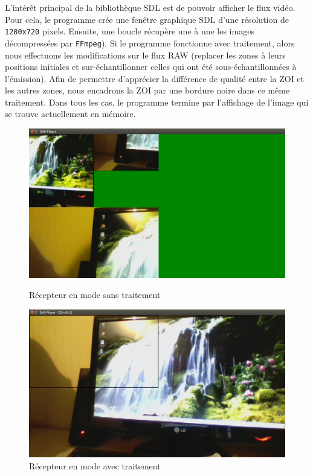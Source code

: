 \documentclass[11pt,a4paper]{article}
\begin{document}
\bigbreak
L'intérêt principal de la bibliothèque SDL est de pouvoir afficher le flux vidéo.
Pour cela, le programme crée une fenêtre graphique SDL d'une résolution de \texttt{1280x720} pixels.
Ensuite, une boucle récupère une à une les images décompressées par \texttt{FFmpeg}).
Si le programme fonctionne avec traitement, alors nous effectuons les modifications sur le flux RAW (replacer les zones à leurs positions initiales et sur-échantillonner celles qui ont été sous-échantillonnées à l'émission). 
Afin de permettre d'apprécier la différence de qualité entre la ZOI et les autres zones, nous encadrons la ZOI par une bordure noire dans ce même traitement.
Dans tous les cas, le programme termine par l'affichage de l'image qui se trouve actuellement en mémoire.

\begin{figure}[H]
  \includegraphics[width=\linewidth]{images/recepteur_sans_traitement.png}
  \caption{Récepteur en mode sans traitement}
\endminipage\hfill
{}
  \includegraphics[width=\linewidth]{images/recepteur_avec_traitement.png}
  \caption{Récepteur en mode avec traitement}
\endminipage
\end{figure}
\end{document}
